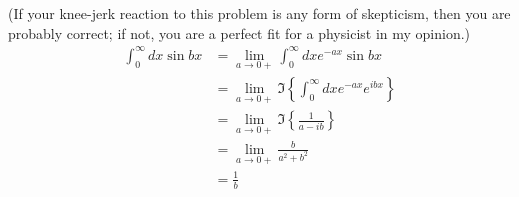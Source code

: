 \item

(If your knee-jerk reaction to this problem is any form of skepticism, then you are probably correct;
if not, you are a perfect fit for a physicist in my opinion.)
\begin{align*}
	\int_0^\infty dx \sin bx
	&= \lim_{a \to 0+} \int_0^\infty dx e^{-ax} \sin bx \\
	&= \lim_{a \to 0+} \Im \left\{ \int_0^\infty dx e^{-ax} e^{ibx} \right\} \\
	&= \lim_{a \to 0+} \Im \left\{ \frac{1}{a - ib} \right\} \\
	&= \lim_{a \to 0+} \frac{b}{a^2 + b^2} \\
	&= \frac{1}{b}
\end{align*}